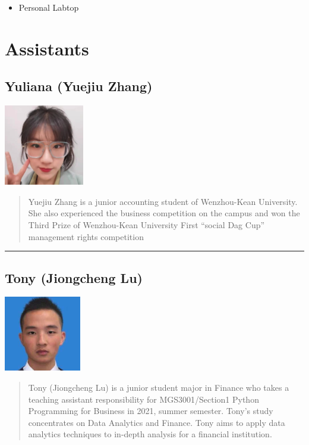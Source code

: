 \documentclass[
]{book}
\providecommand{\tightlist}{%
  \setlength{\itemsep}{0pt}\setlength{\parskip}{0pt}}
\begin{document}
\begin{itemize}
\tightlist
\item
  Personal Labtop
\end{itemize}

\hypertarget{assistants}{%
\section{Assistants}\label{assistants}}

\hypertarget{yuliana-yuejiu-zhang}{%
\subsection{Yuliana (Yuejiu Zhang)}\label{yuliana-yuejiu-zhang}}

\includegraphics{image/ta_yul.png}

\begin{quote}
Yuejiu Zhang is a junior accounting student of Wenzhou-Kean University. She also experienced the business competition on the campus and won the Third Prize of Wenzhou-Kean University First ``social Dag Cup'' management rights competition
\end{quote}

\begin{center}\rule{0.5\linewidth}{0.5pt}\end{center}

\hypertarget{tony-jiongcheng-lu}{%
\subsection{Tony (Jiongcheng Lu)}\label{tony-jiongcheng-lu}}

\includegraphics{image/ta_to.png}

\begin{quote}
Tony (Jiongcheng Lu) is a junior student major in Finance who takes a teaching assistant responsibility for MGS3001/Section1 Python Programming for Business in 2021, summer semester. Tony's study concentrates on Data Analytics and Finance. Tony aims to apply data analytics techniques to in-depth analysis for a financial institution.
\end{quote}
\end{document}
